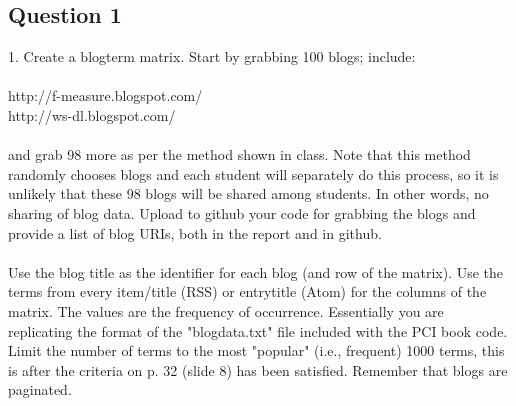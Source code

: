 \documentclass[10pt,letterpaper]{article}
\begin{document}
\subsection{Question 1}
1.  Create a blog\-term matrix.  Start by grabbing 100 blogs; include:\\
\\
http://f-measure.blogspot.com/\\
http://ws-dl.blogspot.com/\\
\\
and grab 98 more as per the method shown in class.  Note that this method randomly chooses blogs and each student will separately do this process, so it is unlikely that these 98 blogs will be shared among students.  In other words, no sharing of blog data.  Upload to github your code for grabbing the blogs and provide a list of blog URIs, both in the report and in github.\\
\\
Use the blog title as the identifier for each blog (and row of the matrix).  Use the terms from every item/title (RSS) or entry\/title (Atom) for the columns of the matrix.  The values are the frequency of occurrence.  Essentially you are replicating the format of the "blogdata.txt" file included with the PCI book code.  Limit the number of terms to the most "popular" (i.e., frequent) 1000 terms, this is \*after\* the criteria on p. 32 (slide 8) has been satisfied. Remember that blogs are paginated.\\  
\\
\end{document}
